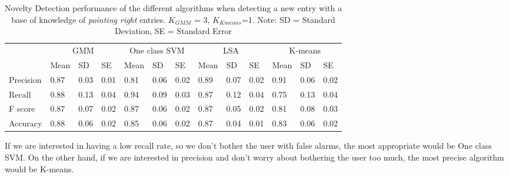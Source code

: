 \begin{table}[!ht]
	\footnotesize
	\renewcommand{\arraystretch}{2}
	\begin{tabular}{p{1.2cm}p{0.7cm}p{0.6cm}p{0.7cm}p{0.7cm}p{0.6cm}p{0.7cm}p{0.7cm}p{0.6cm}p{0.7cm}p{0.7cm}p{0.6cm}p{0.7cm}}
	\hline 
	 & \multicolumn{3}{c}{GMM}& \multicolumn{3}{c}{One class SVM}& \multicolumn{3}{c}{LSA}& \multicolumn{3}{c}{K-means} \\
	 & Mean    & SD & SE& Mean    & SD & SE& Mean    & SD & SE& Mean    & SD & SE \\
	\hline
	Precision  & 0.87 & 0.03 & 0.01 & 0.81 & 0.06 & 0.02 & 0.89 & 0.07 & 0.02 & 0.91 & 0.06 & 0.02      \\
	Recall  & 0.88 & 0.13 & 0.04 & 0.94 & 0.09 & 0.03 & 0.87 & 0.12 & 0.04 & 0.75 & 0.13 & 0.04    \\
	F score  & 0.87 & 0.07 & 0.02 & 0.87 & 0.06 & 0.02 & 0.87 & 0.05 & 0.02 & 0.81 & 0.08 & 0.03    \\ 
	Accuracy   & 0.88 & 0.06 & 0.02 & 0.85 & 0.06 & 0.02 & 0.87 & 0.04 & 0.01 & 0.83 & 0.06 & 0.02   \\
	\hline
	\end{tabular}
	\centering
	\caption[Novelty Detection perfomance for \emph{pointing right} entries]{Novelty Detection performance of the different algorithms when detecting a new entry with a base of knowledge of \emph{pointing right} entries. $ K_{GMM} $ = 3, $ K_{Kmeans} $=1. Note: SD = Standard Deviation, SE = Standard Error  }
\end{table}

If we are interested in having a low recall rate, so we don't bother the user with false alarms, the most appropriate would be One class SVM. On the other hand, if we are interested in precision and don't worry about bothering the user too much, the most precise algorithm would be K-means.


